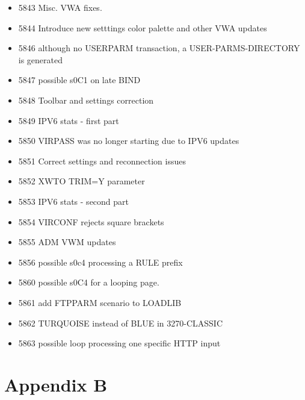 \documentclass[letterpaper,10pt,english]{sphinxmanual}
\begin{document}
\begin{itemize}
\item {} 
5843 Misc. VWA fixes.

\item {} 
5844 Introduce new setttings color palette and other VWA updates

\item {} 
5846 although no USERPARM transaction, a USER-PARMS-DIRECTORY is generated

\item {} 
5847 possible s0C1 on late BIND

\item {} 
5848 Toolbar and settings correction

\item {} 
5849 IPV6 stats - first part

\item {} 
5850 VIRPASS was no longer starting due to IPV6 updates

\item {} 
5851 Correct settings and reconnection issues

\item {} 
5852 XWTO TRIM=Y parameter

\item {} 
5853 IPV6 stats - second part

\item {} 
5854 VIRCONF rejects square brackets

\item {} 
5855 ADM VWM updates

\item {} 
5856 possible s0c4 processing a RULE prefix

\item {} 
5860 possible s0C4 for a looping page.

\item {} 
5861 add FTPPARM scenario to LOADLIB

\item {} 
5862 TURQUOISE instead of BLUE in 3270-CLASSIC

\item {} 
5863 possible loop processing one specific HTTP input

\end{itemize}


\chapter{Appendix B}
\label{\detokenize{TN202003:appendix-b}}
\end{document}
